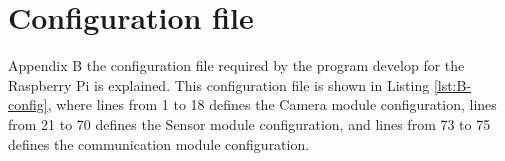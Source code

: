 \chapter{Configuration file}
\label{chap:config_file}

 Appendix B the configuration file required by the program develop for the Raspberry Pi is explained. This configuration file is shown in Listing \ref{lst:B-config}, where lines from 1 to 18 defines the Camera module configuration, lines from  21 to 70 defines the Sensor module configuration, and lines from 73 to 75 defines the communication module configuration.


